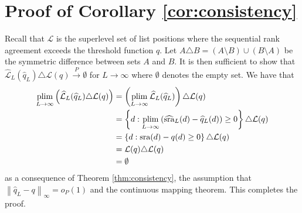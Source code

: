\documentclass[12pt,a4paper]{article}
\newcommand{\nn}{\nonumber}
\newcommand{\plim}{\operatornamewithlimits{plim}}
\theoremstyle{plain}
\begin{document}
\section{Proof of Corollary \ref{cor:consistency}}
\label{sec:appB}
Recall that $\mathcal{L}$ is the superlevel set of list positions
where the sequential rank agreement exceeds the threshold function
$q$. Let $A \triangle B = (A \setminus B) \cup (B \setminus A)$ be the
symmetric difference between sets $A$ and $B$. It is then sufficient
to show that $\widehat{\mathcal{L}}_L(\widehat{q}_L) \triangle \mathcal{L}(q) \overset{P}{\longrightarrow} \emptyset$
for $L \rightarrow \infty$ where $\emptyset$ denotes the empty set.
We have that
\begin{align}
  \plim_{L \rightarrow \infty}\left(\widehat{\mathcal{L}}_L(\widehat{q}_L) \triangle \mathcal{L}(q)\right) &=   \left(\plim_{L \rightarrow \infty}\widehat{\mathcal{L}}_L(\widehat{q}_L)\right) \triangle \mathcal{L}(q)\\
  &= \left\{d : \plim_{L\rightarrow \infty} \left(\widehat{\textrm{sra}}_L(d) - \widehat{q}_L(d)\right)\geq 0\right\} \triangle \mathcal{L}(q)\nn\\
  &= \left\{d : \textrm{sra}(d) - q(d) \geq 0\right\}\triangle \mathcal{L}(q)\nn\\
  &= \mathcal{L}(q)\triangle \mathcal{L}(q)\nn\\
  &= \emptyset\nn
\end{align}
as a consequence of Theorem \ref{thm:consistency}, the assumption that $\left\|\widehat{q}_L - q\right\|_\infty = o_P(1)$ and the continuous mapping theorem. This completes the proof.
\end{document}
